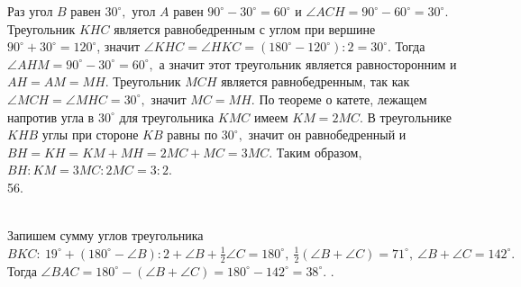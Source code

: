 \documentclass[12pt]{article}
\begin{document}
Раз угол $B$ равен $30^\circ,$ угол $A$ равен $90^\circ-30^\circ=60^\circ$ и $\angle ACH=90^\circ-60^\circ=30^\circ.$  Треугольник $KHC$ является равнобедренным с углом при вершине $90^\circ+30^\circ=120^\circ$, значит $\angle KHC=\angle HKC=(180^\circ-120^\circ):2=30^\circ.$ Тогда $\angle AHM=90^\circ-30^\circ=60^\circ,$ а значит этот треугольник является равносторонним и $AH=AM=MH.$ Треугольник $MCH$ является равнобедренным, так как $\angle MCH=\angle MHC=30^\circ,$ значит $MC=MH.$  По теореме о катете, лежащем напротив угла в $30^\circ$ для треугольника $KMC$ имеем $KM=2MC.$ В треугольнике $KHB$ углы при стороне $KB$ равны по $30^\circ,$ значит он равнобедренный и  $BH=KH=KM+MH=2MC+MC=3MC.$ Таким образом, $BH:KM=3MC:2MC=3:2.$\\
56. \begin{figure}[ht!]
\end{figure}\\
Запишем сумму углов треугольника $BKC:\ 19^\circ+(180^\circ-\angle B):2+\angle B+\frac{1}{2}\angle C=180^\circ,\ \frac{1}{2}(\angle B+\angle C)=71^\circ,\ \angle B+\angle C=142^\circ.$ Тогда $\angle BAC=180^\circ-(\angle B+\angle C)=180^\circ-142^\circ=38^\circ.$\newpage
{}. \begin{figure}[ht!]
\end{figure}\\
\end{document}
